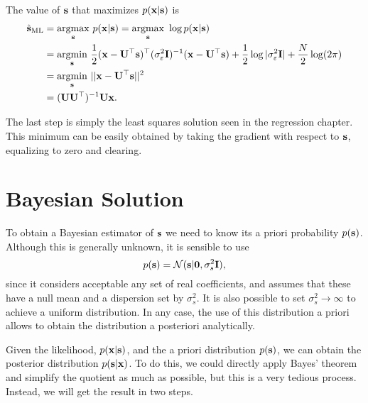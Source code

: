 The value of ${\mathbf s}$ that maximizes $p({\mathbf x} | {\mathbf s})$ is
\begin{align}
\hat{{\mathbf s}}_\text{ML} 
   &= \underset{{\mathbf s}}{\operatorname{argmax}}~ p( {\mathbf x} | {\mathbf s} ) 
    = \underset{{\mathbf s}}{\operatorname{argmax}}~ \log p( {\mathbf x} | {\mathbf s} ) \nonumber \\
   &= \underset{{\mathbf s}}{\operatorname{argmin}}~ \frac{1}{2} ({\mathbf x} - {\mathbf U}^\top{\mathbf s})^\top(\sigma_\varepsilon^2{\mathbf I})^{-1}
                              ({\mathbf x} - {\mathbf U}^\top{\mathbf s}) 
                + \frac{1}{2} \log|\sigma_\varepsilon^2{\mathbf I}|+\frac{N}{2}\log(2\pi) 
                \nonumber \\
   &= \underset{{\mathbf s}}{\operatorname{argmin}}~ ||{\mathbf x} - {\mathbf U}^\top{\mathbf s}||^2\\
   &= ({\mathbf U} {\mathbf U}^\top)^{-1} {\mathbf U}{\mathbf x}.
\label{sml}
\end{align}

The last step is simply the least squares solution seen in the regression chapter. This minimum can be easily obtained by taking the gradient with respect to ${\mathbf s}$, equalizing to zero and clearing.


\section{Bayesian Solution}

To obtain a Bayesian estimator of ${\mathbf s}$ we need to know its a priori probability $p({\mathbf s})$. Although this is generally unknown, it is sensible to use
\begin{equation}
p({\mathbf s}) = {\mathcal N}({\mathbf s} | \mathbf{0}, \sigma_s^2{\mathbf I}),
\end{equation}
since it considers acceptable any set of real coefficients, and assumes that these have a null mean and a dispersion set by $\sigma_s^2 $. It is also possible to set $\sigma_s^2 \rightarrow \infty$ to achieve a uniform distribution. In any case, the use of this distribution a priori allows to obtain the distribution a posteriori analytically.

Given the likelihood, $p({\mathbf x} | {\mathbf s})$, and the a priori distribution $p({\mathbf s})$, we can obtain the posterior distribution $p({\mathbf s} | {\mathbf x}) $. To do this, we could directly apply Bayes' theorem and simplify the quotient as much as possible, but this is a very tedious process. Instead, we will get the result in two steps.

